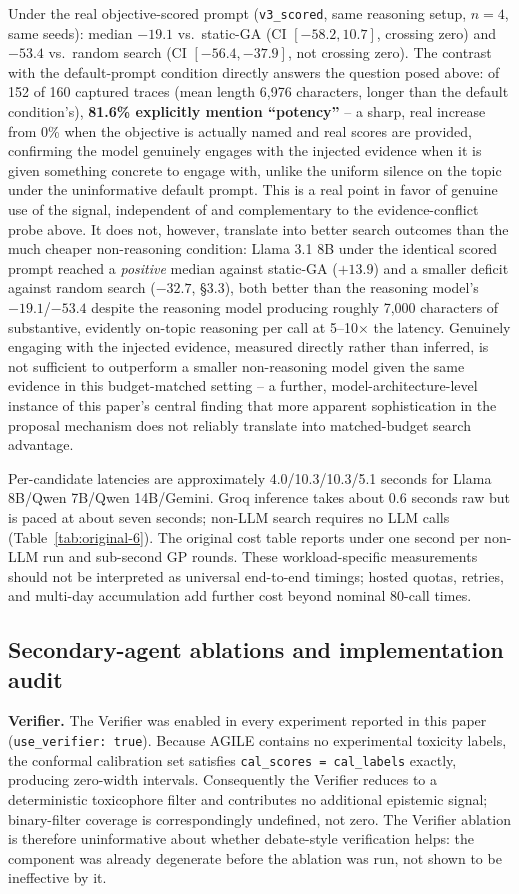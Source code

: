 \documentclass{article}
\begin{document}
Under the real objective-scored prompt (\texttt{v3\_scored}, same reasoning setup, $n=4$, same seeds): median $-19.1$ vs.\ static-GA (CI $[-58.2,10.7]$, crossing zero) and $-53.4$ vs.\ random search (CI $[-56.4,-37.9]$, not crossing zero). The contrast with the default-prompt condition directly answers the question posed above: of 152 of 160 captured traces (mean length 6{,}976 characters, longer than the default condition's), \textbf{81.6\% explicitly mention ``potency''} -- a sharp, real increase from 0\% when the objective is actually named and real scores are provided, confirming the model genuinely engages with the injected evidence when it is given something concrete to engage with, unlike the uniform silence on the topic under the uninformative default prompt. This is a real point in favor of genuine use of the signal, independent of and complementary to the evidence-conflict probe above. It does not, however, translate into better search outcomes than the much cheaper non-reasoning condition: Llama 3.1 8B under the identical scored prompt reached a \emph{positive} median against static-GA ($+13.9$) and a smaller deficit against random search ($-32.7$, \S3.3), both better than the reasoning model's $-19.1$/$-53.4$ despite the reasoning model producing roughly 7{,}000 characters of substantive, evidently on-topic reasoning per call at 5--10$\times$ the latency. Genuinely engaging with the injected evidence, measured directly rather than inferred, is not sufficient to outperform a smaller non-reasoning model given the same evidence in this budget-matched setting -- a further, model-architecture-level instance of this paper's central finding that more apparent sophistication in the proposal mechanism does not reliably translate into matched-budget search advantage.

Per-candidate latencies are approximately 4.0/10.3/10.3/5.1 seconds for Llama 8B/Qwen 7B/Qwen 14B/Gemini. Groq inference takes about 0.6 seconds raw but is paced at about seven seconds; non-LLM search requires no LLM calls (Table~\ref{tab:original-6}). The original cost table reports under one second per non-LLM run and sub-second GP rounds. These workload-specific measurements should not be interpreted as universal end-to-end timings; hosted quotas, retries, and multi-day accumulation add further cost beyond nominal 80-call times.

\subsection{Secondary-agent ablations and implementation audit}
\textbf{Verifier.} The Verifier was enabled in every experiment reported in this paper (\texttt{use\_verifier: true}). Because AGILE contains no experimental toxicity labels, the conformal calibration set satisfies \texttt{cal\_scores = cal\_labels} exactly, producing zero-width intervals. Consequently the Verifier reduces to a deterministic toxicophore filter and contributes no additional epistemic signal; binary-filter coverage is correspondingly undefined, not zero. The Verifier ablation is therefore uninformative about whether debate-style verification helps: the component was already degenerate before the ablation was run, not shown to be ineffective by it.
\end{document}
